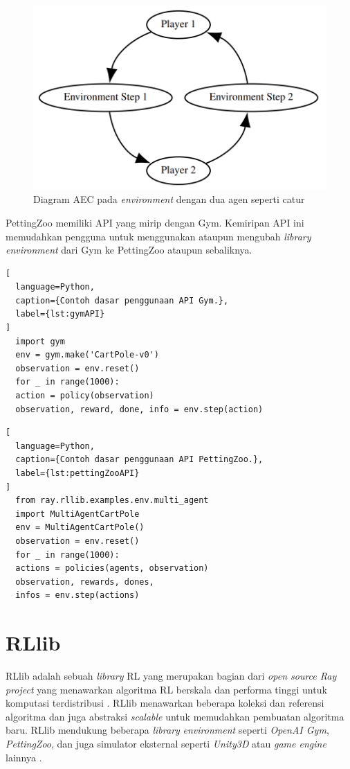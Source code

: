 \begin{figure}[H]
  \centering
    \includegraphics[scale=0.5]{gambar/actor_environment_cycle.png}
    \caption{Diagram AEC pada \emph{environment} dengan dua agen seperti catur}
    \label{fig:actorEnvironmentCycle}
\end{figure}

PettingZoo memiliki API yang mirip dengan Gym. Kemiripan API ini memudahkan pengguna untuk menggunakan ataupun mengubah \emph{library environment} dari Gym ke PettingZoo ataupun sebaliknya.

\begin{lstlisting}[
  language=Python,
  caption={Contoh dasar penggunaan API Gym.},
  label={lst:gymAPI}
]
  import gym
  env = gym.make('CartPole-v0')
  observation = env.reset()
  for _ in range(1000):
  action = policy(observation)
  observation, reward, done, info = env.step(action)
\end{lstlisting}

\begin{lstlisting}[
  language=Python,
  caption={Contoh dasar penggunaan API PettingZoo.},
  label={lst:pettingZooAPI}
]
  from ray.rllib.examples.env.multi_agent
  import MultiAgentCartPole
  env = MultiAgentCartPole()
  observation = env.reset()
  for _ in range(1000):
  actions = policies(agents, observation)
  observation, rewards, dones,
  infos = env.step(actions)
\end{lstlisting}

\section{RLlib}
RLlib adalah sebuah \emph{library} RL yang merupakan bagian dari \emph{open source Ray project} yang menawarkan
algoritma RL berskala dan performa tinggi untuk komputasi terdistribusi \citep{rllib}.
RLlib menawarkan beberapa koleksi dan referensi algoritma dan juga abstraksi \emph{scalable} untuk memudahkan
pembuatan algoritma baru. RLlib mendukung beberapa \emph{library} \emph{environment} seperti \emph{OpenAI Gym},
\emph{PettingZoo}, dan juga simulator eksternal seperti \emph{Unity3D} atau \emph{game engine} lainnya \citep{rllibDocumentation}.